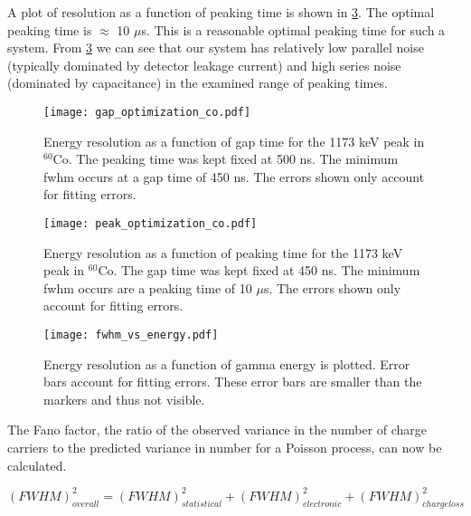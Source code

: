 A plot of resolution as a function of peaking time is shown in \ref{peak}. The optimal peaking time is $\approx $ 10 $\mu$s. This is a reasonable optimal peaking time for such a system. From \ref{peak} we can see that our system has relatively low parallel noise (typically dominated by detector leakage current) and high series noise (dominated by capacitance) in the examined range of peaking times.

\begin{figure}[]
\begin{centering}
\texttt{[image: gap\_optimization\_co.pdf]}
\caption{Energy resolution as a function of gap time for the 1173 keV peak in ${}^{60}$Co. The peaking time was kept fixed at 500 ns. The minimum fwhm occurs at a gap time of 450 ns. The errors shown only account for fitting errors.}
\label{gap}
\end{centering}
\end{figure}
\vspace{5mm}

\begin{figure}[]
\begin{centering}
\texttt{[image: peak\_optimization\_co.pdf]}
\caption{Energy resolution as a function of peaking time for the 1173 keV peak in ${}^{60}$Co. The gap time was kept fixed at 450 ns. The minimum fwhm occurs are a peaking time of 10 $\mu$s. The errors shown only account for fitting errors.}
\label{peak}
\end{centering}
\end{figure}
\vspace{5mm}

\begin{figure}[]
\begin{centering}
\texttt{[image: fwhm\_vs\_energy.pdf]}
\caption{Energy resolution as a function of gamma energy is plotted. Error bars account for fitting errors. These error bars are smaller than the markers and thus not visible.}
\label{peak}
\end{centering}
\end{figure}
\vspace{5mm}

The Fano factor, the ratio of the observed variance in the number of charge carriers to the predicted variance in number for a Poisson process, can now be calculated.

\begin{equation}
(FWHM)^{2}_{overall} = (FWHM)^{2}_{statistical}+ (FWHM)^{2}_{electronic} + (FWHM)^{2}_{chargeloss}
\end{equation}

